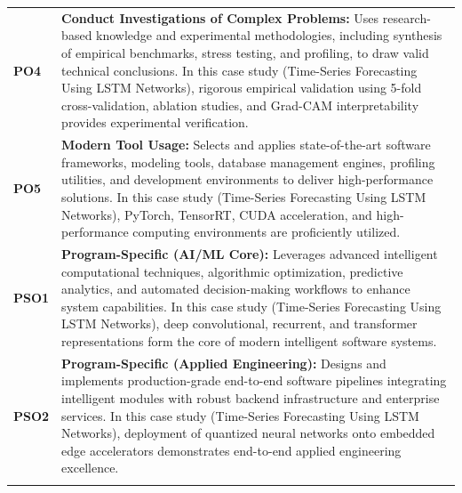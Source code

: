 {\begin{longtable}{@{}>{\centering\arraybackslash}p{1.8cm} p{13.2cm}@{}}
    \addlinespace
\textbf{PO4} & \textbf{Conduct Investigations of Complex Problems:} Uses research-based knowledge and experimental methodologies, including synthesis of empirical benchmarks, stress testing, and profiling, to draw valid technical conclusions. In this case study (Time-Series Forecasting Using LSTM Networks), rigorous empirical validation using 5-fold cross-validation, ablation studies, and Grad-CAM interpretability provides experimental verification. \\
    \addlinespace
\textbf{PO5} & \textbf{Modern Tool Usage:} Selects and applies state-of-the-art software frameworks, modeling tools, database management engines, profiling utilities, and development environments to deliver high-performance solutions. In this case study (Time-Series Forecasting Using LSTM Networks), PyTorch, TensorRT, CUDA acceleration, and high-performance computing environments are proficiently utilized. \\
    \addlinespace
\textbf{PSO1} & \textbf{Program-Specific (AI/ML Core):} Leverages advanced intelligent computational techniques, algorithmic optimization, predictive analytics, and automated decision-making workflows to enhance system capabilities. In this case study (Time-Series Forecasting Using LSTM Networks), deep convolutional, recurrent, and transformer representations form the core of modern intelligent software systems. \\
    \addlinespace
\textbf{PSO2} & \textbf{Program-Specific (Applied Engineering):} Designs and implements production-grade end-to-end software pipelines integrating intelligent modules with robust backend infrastructure and enterprise services. In this case study (Time-Series Forecasting Using LSTM Networks), deployment of quantized neural networks onto embedded edge accelerators demonstrates end-to-end applied engineering excellence. \\
    \addlinespace
    \bottomrule
\end{longtable}}